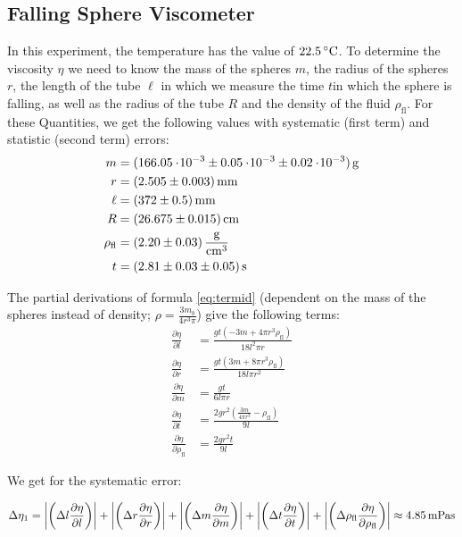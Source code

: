 \subsection{Falling Sphere Viscometer} \label{sec:aufgabe2}
In this experiment, the temperature has the value of $22.5\C$. To determine the viscosity $\eta$ we need to know the mass of the spheres $m$, the radius of the spheres $r$, the length of the tube $\ell$ in which we measure the time $t$in which the sphere is falling, as well as the radius of the tube $R$ and the density of the fluid $\rho_\mathrm{fl}$. For these Quantities, we get the following values with systematic (first term) and statistic (second term) errors:
\begin{align*}
m &= \unit[(166.05\e{-3} \pm 0.05\e{-3} \pm 0.02 \e{-3})]{g}\\
r &= \unit[(2.505 \pm 0.003)]{mm}\\
\ell &= \unit[(372 \pm 0.5)]{mm}\\
R &= \unit[(26.675 \pm 0.015)]{cm}\\
\rho_\mathrm{fl} &= \unit[(2.20 \pm 0.03)]{\frac{g}{cm^3}}\\
t &= \unit[(2.81 \pm 0.03 \pm 0.05)]{s}
\end{align*}





The partial derivations of formula \ref{eq:termid} (dependent on the mass of the spheres instead of density; $\rho = \frac{3m_b}{4r^3\pi}$) give the following terms:
\begin{align*}
\frac{\partial \eta}{\partial l}  &= \frac{g t \left(-3 m+4 \pi  r^3 \rho_\mathrm{fl}\right)}{18 l^2 \pi  r}\\
\frac{\partial \eta}{\partial r} &= \frac{g t \left(3 m+8 \pi  r^3 \rho_\mathrm{fl}\right)}{18 l \pi  r^2}\\
\frac{\partial \eta}{\partial m} &= \frac{g t}{6 l \pi  r}\\
\frac{\partial \eta}{\partial t} &= \frac{2 g r^2 \left(\frac{3 m}{4 \pi  r^3}- \rho_\mathrm{fl}\right)}{9 l}\\
\frac{\partial \eta}{\partial \rho_\mathrm{fl}} &= \frac{2 g r^2 t}{9 l}
\end{align*}

We get for the systematic error:

\begin{equation}
\Delta\eta_1 = 
\abs{\left(\Delta l\frac{\partial \eta}{\partial l}\right)}
+
\abs{\left(\Delta r\frac{\partial \eta}{\partial r}\right)}
+
\abs{\left(\Delta m\frac{\partial \eta}{\partial m}\right)}
+
\abs{\left(\Delta t\frac{\partial \eta}{\partial t}\right)}
+
\abs{\left(\Delta \rho_\mathrm{fl}\frac{\partial \eta}{\partial \rho_\mathrm{fl}}\right)}
\approx \unit[4.85]{mPa s}
\end{equation}

